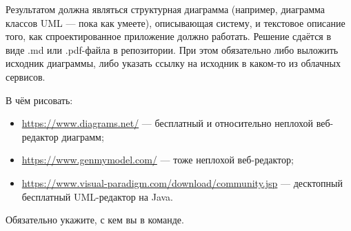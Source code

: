 \documentclass[a5paper]{homework}
\begin{document}
Результатом должна являться структурная диаграмма (например, диаграмма классов UML --- пока как умеете), описывающая систему, и текстовое описание того, как спроектированное приложение должно работать. Решение сдаётся в виде .md или .pdf-файла в репозитории. При этом обязательно либо выложить исходник диаграммы, либо указать ссылку на исходник в каком-то из облачных сервисов.

В чём рисовать:

\begin{itemize}
    \item \url{https://www.diagrams.net/} --- бесплатный и относительно неплохой веб-редактор диаграмм;
    \item \url{https://www.genmymodel.com/} --- тоже неплохой веб-редактор;
    \item \url{https://www.visual-paradigm.com/download/community.jsp} --- десктопный бесплатный UML-редактор на Java.
\end{itemize}

Обязательно укажите, с кем вы в команде.
\end{document}
